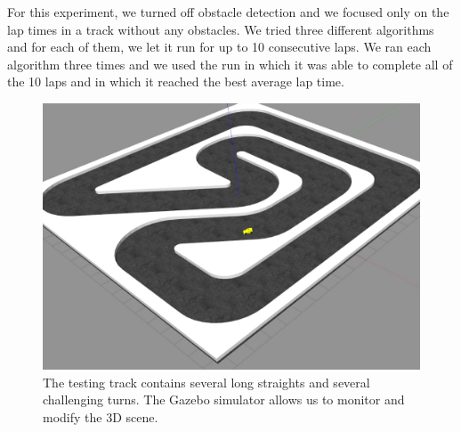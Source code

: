 For this experiment, we turned off obstacle detection and we focused only on the lap times in a track without any obstacles. We tried three different algorithms and for each of them, we let it run for up to 10 consecutive laps. We ran each algorithm three times and we used the run in which it was able to complete all of the 10 laps and in which it reached the best average lap time.

\begin{figure}
	\label{fig:gazebo-track}
	\centering
	\includegraphics[width=\textwidth]{../img/experiments/gazebo-track.png}
	\caption{The testing track contains several long straights and several challenging turns. The Gazebo simulator allows us to monitor and modify the 3D scene.}
\end{figure}


